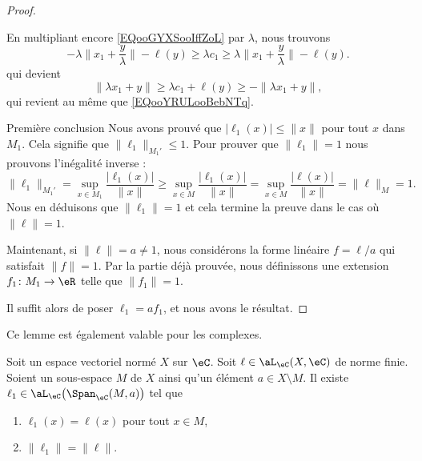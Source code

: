 \begin{proof}
\begin{subproof}
\begin{subproof}
\begin{equation}
                \end{equation}
                En multipliant encore \eqref{EQooGYXSooIffZoL} par \( \lambda\), nous trouvons
                \begin{equation}
                    -\lambda\| x_1+\frac{ y }{ \lambda } \|-\ell(y)\geq \lambda c_1\geq \lambda\| x_1+\frac{ y }{ \lambda } \|-\ell(y).
                \end{equation}
                qui devient
                \begin{equation}
                    \| \lambda x_1+y \|\geq \lambda c_1+\ell(y)\geq -\| \lambda x_1+y \|,
                \end{equation}
                qui revient au même que \eqref{EQooYRULooBebNTq}.
            \end{subproof}
        \item[Première conclusion]
            Nous avons prouvé que \( | \ell_1(x) |\leq \| x \|\) pour tout \( x\) dans \( M_1\). Cela signifie que \( \| \ell_1 \|_{M_1'}\leq 1\). Pour prouver que \( \| \ell_1 \|=1\) nous prouvons l'inégalité inverse :
            \begin{equation}
                \| \ell_1 \|_{M_1'}=\sup_{x\in M_1}\frac{ | \ell_1(x) | }{ \| x \| }\geq\sup_{x\in M}\frac{ | \ell_1(x) | }{ \| x \| }=\sup_{x\in M}\frac{ | \ell(x) | }{ \| x \| }=\| \ell \|_{M}=1.
            \end{equation}
            Nous en déduisons que \( \| \ell_1 \|=1\) et cela termine la preuve dans le cas où \( \|\ell \|=1\).
    \end{subproof}
    Maintenant, si \( \| \ell \|=a\neq 1\), nous considérons la forme linéaire \( f=\ell/a\) qui satisfait \( \| f \|=1\). Par la partie déjà prouvée, nous définissons une extension \( f_1\colon M_1\to \eR\) telle que \( \| f_1 \|=1\).

    Il suffit alors de poser \( \ell_1=af_1\), et nous avons le résultat.
\end{proof}

Ce lemme est également valable pour les complexes.

\begin{lemma}       \label{LEMooBYEGooRswAmh}
    Soit un espace vectoriel normé \( X\) sur \( \eC\). Soit \( \ell\in \aL_{\eC}(X,\eC)\) de norme finie. Soient un sous-espace \( M\) de \( X\) ainsi qu'un élément \( a\in X\setminus M\). Il existe \( \ell_1\in\aL_{\eC}\big( \Span_{\eC}(M, a) \big)\) tel que
    \begin{enumerate}
        \item
            \( \ell_1(x)=\ell(x)\) pour tout \( x\in M\),
        \item
            \( \| \ell_1 \|=\| \ell \|\).
    \end{enumerate}
\end{lemma}

